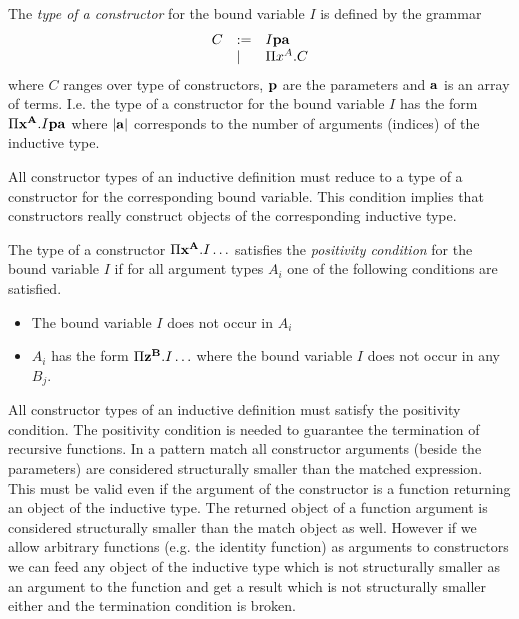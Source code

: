 \begin{definition}
  The \emph{type of a constructor} for the bound variable $I$ is defined by
  the grammar
  $$
  \begin{array}{lll}
    C
    &:= & I \mathbf{p} \mathbf{a}
    \\
    &\mid& \Pi x^A . C
  \end{array}
  $$
  where $C$ ranges over type of constructors, $\mathbf{p}$ are the parameters and
  $\mathbf{a}$ is an array of terms. I.e. the type of a constructor for the bound
  variable $I$ has the form $\Pi \mathbf{x}^{\mathbf{A}}. I \mathbf{p}  \mathbf{a}$ where
  $|\mathbf{a}|$ corresponds to the number of arguments (indices) of the inductive
  type.
\end{definition}

All constructor types of an inductive definition must reduce to a type of a
constructor for the corresponding bound variable. This condition implies that
constructors really construct objects of the corresponding inductive type.


\begin{definition}
  The type of a constructor $\Pi \mathbf{x}^{\mathbf{A}}. I \ldots$ satisfies the
  \emph{positivity condition} for the bound variable $I$ if for all argument
  types $A_i$ one of the following conditions are satisfied.
  \begin{itemize}
  \item The bound variable $I$ does not occur in $A_i$

  \item $A_i$ has the form $\Pi \mathbf{z}^{\mathbf{B}} . I \ldots$ where the bound
    variable $I$ does not occur in any $B_j$.
  \end{itemize}
\end{definition}

All constructor types of an inductive definition must satisfy the positivity
condition. The positivity condition is needed to guarantee the termination of
recursive functions. In a pattern match all constructor arguments (beside the
parameters) are considered structurally smaller than the matched
expression. This must be valid even if the argument of the constructor is a
function returning an object of the inductive type. The returned object of a
function argument is considered structurally smaller than the match object as
well. However if we allow arbitrary functions (e.g. the identity function) as
arguments to constructors we can feed any object of the inductive type which
is not structurally smaller as an argument to the function and get a result
which is not structurally smaller either and the termination condition is
broken.

